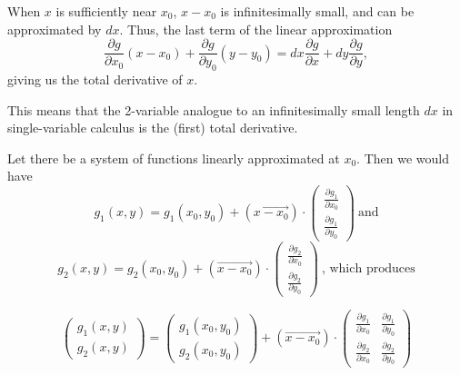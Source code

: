 \documentclass[a4paper, 12pt,oneside,openany]{book}
\begin{document}
When $x$ is sufficiently near $x_0$, $x-x_0$ is infinitesimally small, and can be approximated by $dx$. Thus, the last term of the linear approximation $$\frac{\partial g}{\partial x_0}(x-x_0) + \frac{\partial g}{\partial y_0}(y-y_0) = dx \frac{\partial g}{\partial x} + dy \frac{\partial g}{\partial y},$$ giving us the total derivative of $x$. 

 This means that the 2-variable analogue to an infinitesimally small length $dx$ in single-variable calculus is the (first) total derivative.


Let there be a system of functions linearly approximated at $x_0$. Then we would have $$g_1(x, y) = g_1(x_0, y_0) + (\overrightarrow{x-x_0}) \cdot \begin{pmatrix} \frac{\partial g_1}{\partial x_0} \\ \frac{\partial g_1}{\partial y_0} \end{pmatrix}\ \text{and}$$ $$ g_2(x, y) = g_2(x_0, y_0) + (\overrightarrow{x-x_0}) \cdot \begin{pmatrix} \frac{\partial g_2}{\partial x_0} \\ \frac{\partial g_2}{\partial y_0} \end{pmatrix}\ \text{, which produces} $$ 

$$\begin{pmatrix} g_1(x, y) \\ g_2(x, y) \end{pmatrix} = \begin{pmatrix} g_1(x_0, y_0) \\ g_2(x_0, y_0) \end{pmatrix}+ (\overrightarrow{x-x_0}) \cdot \begin{pmatrix} \frac{\partial g_1}{\partial x_0} & \frac{\partial g_1}{\partial y_0} \\ \frac{\partial g_2}{\partial x_0} & \frac{\partial g_2}{\partial y_0}\end{pmatrix}$$
\end{document}
